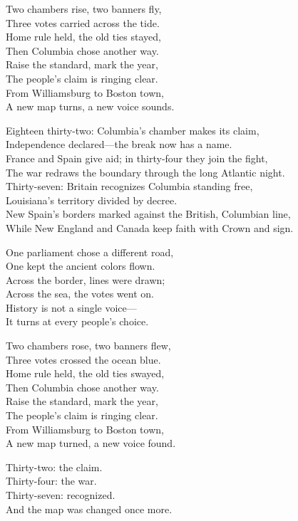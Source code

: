 \begin{lyrics}
Two chambers rise, two banners fly,\\
Three votes carried across the tide.\\
Home rule held, the old ties stayed,\\
Then Columbia chose another way.\\
Raise the standard, mark the year,\\
The people’s claim is ringing clear.\\
From Williamsburg to Boston town,\\
A new map turns, a new voice sounds.

Eighteen thirty-two: Columbia’s chamber makes its claim,\\
Independence declared—the break now has a name.\\
France and Spain give aid; in thirty-four they join the fight,\\
The war redraws the boundary through the long Atlantic night.\\
Thirty-seven: Britain recognizes Columbia standing free,\\
Louisiana’s territory divided by decree.\\
New Spain’s borders marked against the British, Columbian line,\\
While New England and Canada keep faith with Crown and sign.

One parliament chose a different road,\\
One kept the ancient colors flown.\\
Across the border, lines were drawn;\\
Across the sea, the votes went on.\\
History is not a single voice—\\
It turns at every people’s choice.

Two chambers rose, two banners flew,\\
Three votes crossed the ocean blue.\\
Home rule held, the old ties swayed,\\
Then Columbia chose another way.\\
Raise the standard, mark the year,\\
The people’s claim is ringing clear.\\
From Williamsburg to Boston town,\\
A new map turned, a new voice found.

Thirty-two: the claim.\\
Thirty-four: the war.\\
Thirty-seven: recognized.\\
And the map was changed once more.
\end{lyrics}

